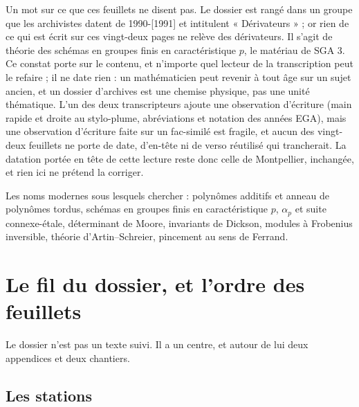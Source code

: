 \documentclass[11pt,a4paper]{article}
\begin{document}
\begin{resume}
Un mot sur ce que ces feuillets ne disent pas. Le dossier est rangé dans un
groupe que les archivistes datent de 1990-[1991] et intitulent
« Dérivateurs » ; or rien de ce qui est écrit sur ces vingt-deux pages ne
relève des dérivateurs. Il s'agit de théorie des schémas en groupes finis en
caractéristique $p$, le matériau de SGA 3. Ce constat porte sur le contenu, et
n'importe quel lecteur de la transcription peut le refaire ; il ne date rien : un
mathématicien peut revenir à tout âge sur un sujet ancien, et un dossier
d'archives est une chemise physique, pas une unité thématique. L'un des deux
transcripteurs ajoute une observation d'écriture (main rapide et droite au
stylo-plume, abréviations et notation des années EGA), mais une observation
d'écriture faite sur un fac-similé est fragile, et aucun des vingt-deux
feuillets ne porte de date, d'en-tête ni de verso réutilisé qui trancherait.
La datation portée en tête de cette lecture reste donc celle de Montpellier,
inchangée, et rien ici ne prétend la corriger.

Les noms modernes sous lesquels chercher : polynômes additifs et anneau de
polynômes tordus, schémas en groupes finis en caractéristique $p$,
$\alpha_p$ et suite connexe-étale, déterminant de Moore, invariants de
Dickson, modules à Frobenius inversible, théorie d'Artin--Schreier,
pincement au sens de Ferrand.

\end{resume}

\section*{Le fil du dossier, et l'ordre des feuillets}

Le dossier n'est pas un texte suivi. Il a
un centre, et autour de lui deux appendices et deux chantiers.

\subsection*{Les stations}
\end{document}
